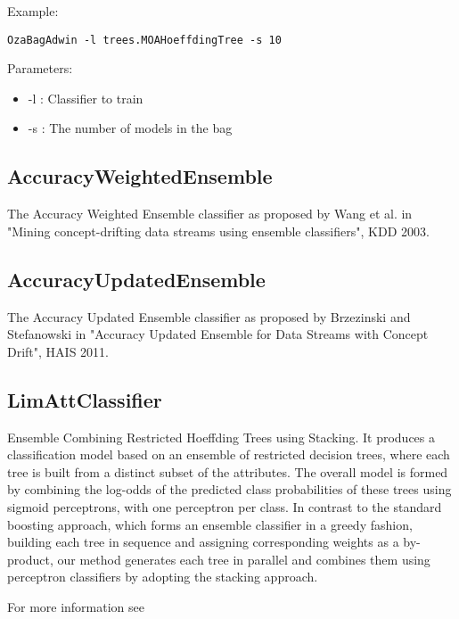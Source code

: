 \documentclass[a4paper,12pt,twoside]{book}
\begin{document}
Example:
\begin{footnotesize}\begin{verbatim}
OzaBagAdwin -l trees.MOAHoeffdingTree -s 10
\end{verbatim}\end{footnotesize}

Parameters:
\begin{itemize}
\item -l : Classifier to train
\item -s : The number of models in the bag
\end{itemize}


 
\subsection{AccuracyWeightedEnsemble}

  The Accuracy Weighted Ensemble classifier as proposed 
  by Wang et al. in "Mining concept-drifting data streams using ensemble classifiers",
   KDD 2003.

\subsection{AccuracyUpdatedEnsemble}

  The Accuracy Updated Ensemble classifier as proposed 
  by Brzezinski and Stefanowski in "Accuracy Updated Ensemble for Data Streams 
  with Concept Drift", HAIS 2011.

\subsection{LimAttClassifier}


  Ensemble Combining Restricted Hoeffding Trees using Stacking.
  It produces a classification model based on an
  ensemble of restricted decision trees, where each tree is built from a
  distinct subset of the attributes. The overall model is formed by
  combining the log-odds of the predicted class probabilities of these trees
  using sigmoid perceptrons, with one perceptron per class.
  In contrast to the standard boosting approach,
  which forms an ensemble classifier in a greedy fashion, building each tree in
  sequence and assigning corresponding weights as a by-product, our
  method generates each tree in parallel and combines them using perceptron
  classifiers by adopting the stacking approach.
 
  For more information see
 
\end{document}
